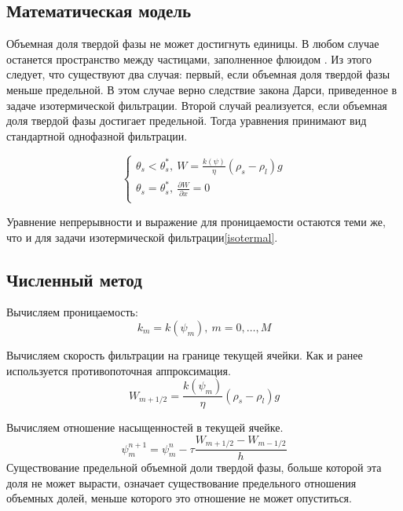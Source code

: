 \documentclass[12pt,a4paper]{article}
\newcommand{\pd}[2]{\frac{\partial #1}{\partial #2}}
\begin{document}
\subsection{Математическая модель}
Объемная доля твердой фазы не может достигнуть единицы. В любом случае останется пространство между частицами, заполненное флюидом \cite{Dobr_phys02}. Из этого следует, что существуют два случая: первый, если объемная доля твердой фазы меньше предельной. В этом случае верно следствие закона Дарси, приведенное в задаче изотермической фильтрации. Второй случай реализуется, если объемная доля твердой фазы достигает предельной. Тогда уравнения принимают вид стандартной однофазной фильтрации.

\begin{equation}
\begin{cases}
\theta_s < \theta_s^*,\  W = \frac{k(\psi)}{\eta} (\rho_s - \rho_l) g\\
\theta_s = \theta_s^*,\  \pd{W}{x} = 0\\
\end{cases}
\end{equation}

Уравнение непрерывности и выражение для проницаемости остаются теми же, что и для задачи изотермической фильтрации\eqref{isotermal}.

\subsection{Численный метод}
Вычисляем проницаемость:
\begin{equation}
k_m = k(\psi_m) , \ m = 0,  \dots ,M
\label{perm_razn2}
\end{equation}

Вычисляем скорость фильтрации на границе текущей ячейки. Как и ранее используется противопоточная аппроксимация.
\begin{equation}
W_{m+1/2} = \frac{k(\psi_m)}{\eta}(\rho_s-\rho_l)g
\label{Darsi_razn2}
\end{equation}

Вычисляем отношение насыщенностей в текущей ячейке. 
\begin{equation}
\psi_m^{n+1} = \psi_m^n - \tau\frac{W_{m+1/2} - W_{m-1/2}}{h}
\label{filtr_razn2}
\end{equation}
Существование предельной объемной доли твердой фазы, больше которой эта доля не может вырасти, означает существование предельного отношения объемных долей, меньше которого это отношение не может опуститься.
\end{document}
